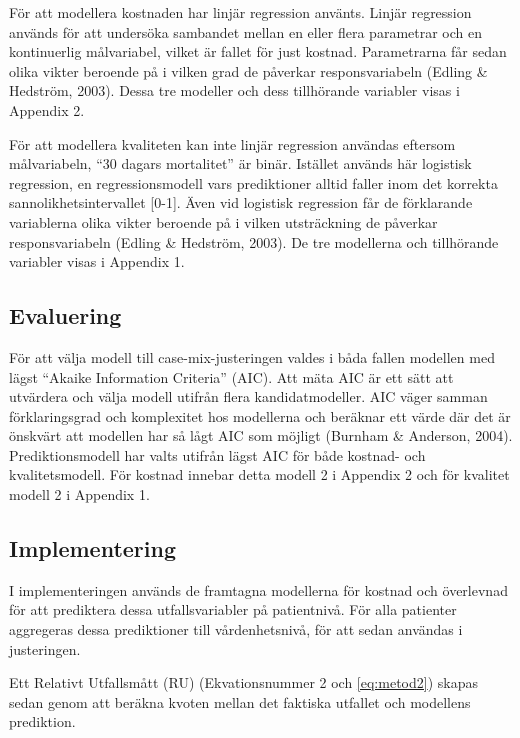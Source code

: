 För att modellera kostnaden har linjär regression använts. Linjär regression används för att undersöka sambandet mellan en eller flera parametrar och en kontinuerlig målvariabel, vilket är fallet för just kostnad. Parametrarna får sedan olika vikter beroende på i vilken grad de påverkar responsvariabeln (Edling \& Hedström, 2003). Dessa tre modeller och dess tillhörande variabler visas i Appendix 2.

För att modellera kvaliteten kan inte linjär regression användas eftersom målvariabeln, “30 dagars mortalitet” är binär. Istället används här logistisk regression, en regressionsmodell vars prediktioner alltid faller inom det korrekta sannolikhetsintervallet [0-1]. Även vid logistisk regression får de förklarande variablerna olika vikter beroende på i vilken utsträckning de påverkar responsvariabeln (Edling \& Hedström, 2003). De tre modellerna och tillhörande variabler visas i Appendix 1. 

\subsection{Evaluering}

För att välja modell till case-mix-justeringen valdes i båda fallen modellen med lägst “Akaike Information Criteria” (AIC). Att mäta AIC är ett sätt att utvärdera och välja modell utifrån flera kandidatmodeller. AIC väger samman förklaringsgrad och komplexitet hos modellerna och beräknar ett värde där det är önskvärt att modellen har så lågt AIC som möjligt (Burnham \& Anderson, 2004). Prediktionsmodell har valts utifrån lägst AIC för både kostnad- och kvalitetsmodell. För kostnad innebar detta modell 2 i Appendix 2 och för kvalitet modell 2 i Appendix 1.

\subsection{Implementering}


I implementeringen används de framtagna modellerna för kostnad och överlevnad för att prediktera dessa utfallsvariabler på patientnivå. För alla patienter aggregeras dessa prediktioner till vårdenhetsnivå, för att sedan användas i justeringen. 

Ett Relativt Utfallsmått (RU) (Ekvationsnummer 2 och \ref{eq:metod2}) skapas sedan genom att beräkna kvoten mellan det faktiska utfallet och modellens prediktion.

